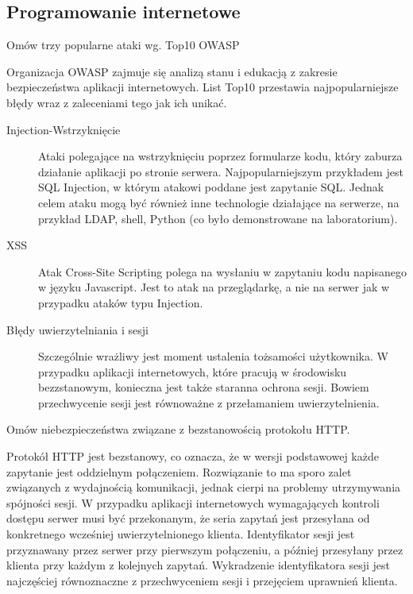 \documentclass[answers,11pt]{exam}
\begin{document}
\subsection{Programowanie internetowe}
\begin{questions}

\question Omów trzy popularne ataki wg. Top10 OWASP
\begin{solution}
Organizacja OWASP zajmuje się analizą stanu i edukacją z zakresie bezpieczeństwa aplikacji internetowych. List Top10 przestawia najpopularniejsze błędy wraz z zaleceniami tego jak ich unikać.
\begin{description}
\item[Injection-Wstrzyknięcie] Ataki polegające na wstrzyknięciu poprzez formularze kodu, który zaburza działanie aplikacji po stronie serwera. Najpopularniejszym przykładem jest SQL Injection, w którym atakowi poddane jest zapytanie SQL. Jednak celem ataku mogą być również inne technologie działające na serwerze, na przykład LDAP, shell, Python (co było demonstrowane na laboratorium).
\item[XSS] Atak Cross-Site Scripting polega na wysłaniu w zapytaniu kodu napisanego w języku Javascript. Jest to atak na przeglądarkę, a nie na serwer jak w przypadku ataków typu Injection.
\item[Błędy uwierzytelniania i sesji] Szczególnie wrażliwy jest moment ustalenia tożsamości użytkownika. W przypadku aplikacji internetowych, które pracują w środowisku bezzstanowym, konieczna jest także staranna ochrona sesji. Bowiem przechwycenie sesji jest równoważne z przełamaniem uwierzytelnienia.
\end{description}
\end{solution}

\question Omów niebezpieczeństwa związane z bezstanowością protokołu HTTP.
\begin{solution}
Protokół HTTP jest bezstanowy, co oznacza, że w wersji podstawowej każde zapytanie jest oddzielnym połączeniem. Rozwiązanie to ma sporo zalet związanych z wydajnością komunikacji, jednak cierpi na problemy utrzymywania spójności sesji. W przypadku aplikacji internetowych wymagających kontroli dostępu serwer musi być przekonanym, że seria zapytań jest przesyłana od konkretnego wcześniej uwierzytelnionego klienta. Identyfikator sesji jest przyznawany przez serwer przy pierwszym połączeniu, a później przesyłany przez klienta przy każdym z kolejnych zapytań. Wykradzenie identyfikatora sesji jest najczęściej równoznaczne z przechwyceniem sesji i przejęciem uprawnień klienta. 
\end{solution}


\end{questions}
\end{document}
